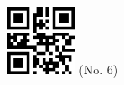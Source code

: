\documentclass[twocolumn]{article}
\title{}
\date{}
\begin{document}

\begin{center}
 \hspace{0.2cm}
 \includegraphics[width=2cm]{qrcode-6.png}
 \hspace{0.5cm}
 \Large{  (No. 6) }
\end{center}


\end{document}

